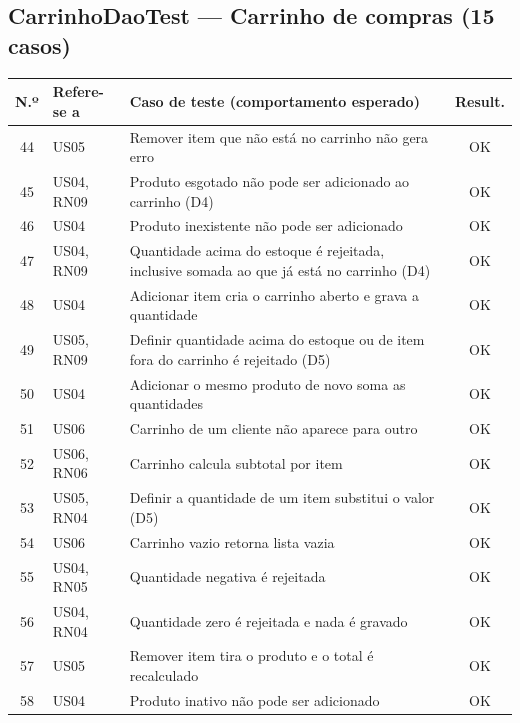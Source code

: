 \subsection*{CarrinhoDaoTest --- Carrinho de compras (15 casos)}
\footnotesize
\begin{longtable}{|c|p{2.5cm}|p{8.4cm}|c|}
\hline
\rowcolor{gray!30} \textbf{N.º} & \textbf{Refere-se a} & \textbf{Caso de teste (comportamento esperado)} & \textbf{Result.} \\ \hline
\endhead
44 & US05 & Remover item que não está no carrinho não gera erro & \cellcolor{green!20}OK \\ \hline
45 & US04, RN09 & Produto esgotado não pode ser adicionado ao carrinho (D4) & \cellcolor{green!20}OK \\ \hline
46 & US04 & Produto inexistente não pode ser adicionado & \cellcolor{green!20}OK \\ \hline
47 & US04, RN09 & Quantidade acima do estoque é rejeitada, inclusive somada ao que já está no carrinho (D4) & \cellcolor{green!20}OK \\ \hline
48 & US04 & Adicionar item cria o carrinho aberto e grava a quantidade & \cellcolor{green!20}OK \\ \hline
49 & US05, RN09 & Definir quantidade acima do estoque ou de item fora do carrinho é rejeitado (D5) & \cellcolor{green!20}OK \\ \hline
50 & US04 & Adicionar o mesmo produto de novo soma as quantidades & \cellcolor{green!20}OK \\ \hline
51 & US06 & Carrinho de um cliente não aparece para outro & \cellcolor{green!20}OK \\ \hline
52 & US06, RN06 & Carrinho calcula subtotal por item & \cellcolor{green!20}OK \\ \hline
53 & US05, RN04 & Definir a quantidade de um item substitui o valor (D5) & \cellcolor{green!20}OK \\ \hline
54 & US06 & Carrinho vazio retorna lista vazia & \cellcolor{green!20}OK \\ \hline
55 & US04, RN05 & Quantidade negativa é rejeitada & \cellcolor{green!20}OK \\ \hline
56 & US04, RN04 & Quantidade zero é rejeitada e nada é gravado & \cellcolor{green!20}OK \\ \hline
57 & US05 & Remover item tira o produto e o total é recalculado & \cellcolor{green!20}OK \\ \hline
58 & US04 & Produto inativo não pode ser adicionado & \cellcolor{green!20}OK \\ \hline
\end{longtable}\normalsize
